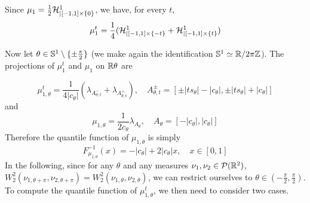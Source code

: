     Since $\mu_1 = \frac{1}{2} \mathcal{H}^1_{|[-1,1]\times\{0\}}$, we have, for every $t$, 
    \begin{equation} \mu_1^t = \frac{1}{4} (\mathcal{H}^1_{|[-1,1]\times\{-t\}} + \mathcal{H}^1_{|[-1,1]\times\{t\}})\end{equation}
    
    Now let $\theta \in \mathbb S^1 \setminus \{\pm \frac{\pi}{2}\}$ (we make again the identification $\mathbb S^1 \simeq \mathbb R/2\pi\mathbb{Z}$). The projections of $\mu^t_1$ and $\mu_1$ on $\mathbb R\theta$ are 
    
    \begin{equation} \mu^t_{1,\theta} = \frac{1}{4|c_\theta|} (\lambda_{A^-_{\theta,t}} + \lambda_{A^+_{\theta,t}}), \quad A^\pm_{\theta,t} = [\pm |ts_\theta| - |c_\theta|, \pm |ts_\theta| + |c_\theta|] \end{equation}
    and 
    \begin{equation} \mu_{1,\theta} = \frac{1}{2c_\theta} \lambda_{A_\theta}, \quad A_\theta = [-|c_\theta|,|c_\theta|]\end{equation}
    Therefore the quantile function of $\mu_{1,\theta}$ is simply
    \begin{equation}
        \label{eq:quantile_segment_theta}
        F^{-1}_{\mu_{1,\theta}}(x) = -|c_\theta| + 2|c_\theta|x, \quad x \in [0,1]
    \end{equation}
    In the following, since for any $\theta$ and any measures $\nu_1,\nu_2 \in \mathcal{P}(\mathbb R^2)$, $W^2_2(\nu_{1,\theta+\pi},\nu_{2,\theta+\pi}) = W_2^2(\nu_{1,\theta},\nu_{2,\theta})$, we can restrict ourselves to $\theta \in (-\frac{\pi}{2},\frac{\pi}{2})$. To compute the quantile function of $\mu^t_{1,\theta}$, we then need to consider two cases.
